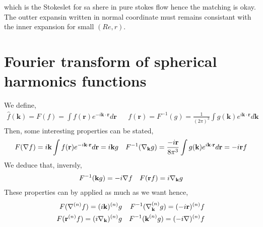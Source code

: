 which
 is the Stokeslet for sa shere in pure stokes flow hence the matching is okay.
The outter expansin written in normal coordinate must remains consistant with the inner expansion for small $(Re,r)$.

\section{Fourier transform of spherical harmonics functions}

We define,
\begin{align}
    \hat{f}(\textbf{k}) = F(f) = \int f(\textbf{r}) e^{-i\textbf{k}\cdot \textbf{r}} d\textbf{r}
    &&
    f(\textbf{r}) = F^{-1}(g)= \frac{1}{(2\pi)^3}\int g(\textbf{k}) e^{i\textbf{k}\cdot \textbf{r}} d\textbf{k}
\end{align}
Then, some interesting properties can be stated,
\begin{align}
    F(\mathbf{\nabla} f)
    =
    i \textbf{k} \int f(\textbf{r}) e^{-i\textbf{k}\cdot \textbf{r}} d\textbf{r}
    =
    i \textbf{k} g
    &&
    F^{-1}(\mathbf{\nabla}_\textbf{k} g)
    =
    \frac{-i\textbf{r}}{8\pi^3} \int g(\textbf{k}) e^{i\textbf{k}\cdot \textbf{r}} d\textbf{r}
    =
    - i \textbf{r} f
\end{align}
We deduce that, inversly,
\begin{align}
    F^{-1}(\textbf{k} g)
    =
    - i \mathbf{\nabla} f
    &&
    F(\textbf{r} f)
    = i \mathbf{\nabla}_\textbf{k} g
\end{align}
These properties can by applied as much as we want hence,
\begin{align}
    F(\mathbf{\nabla}^{(n)} f) = (i\textbf{k})^{(n)}g
    &&
    F^{-1}(\mathbf{\nabla}_\textbf{k}^{(n)} g) = (-i\textbf{r})^{(n)} f\\
    F(\textbf{r}^{(n)} f) = (i\mathbf{\nabla}_\textbf{k})^{(n)} g
    &&
    F^{-1}(\textbf{k}^{(n)} g) = (-i\mathbf{\nabla})^{(n)}f
\end{align}

